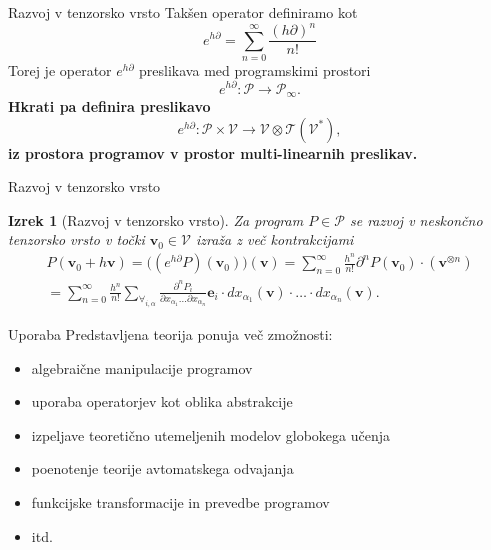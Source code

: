 \documentclass{beamer}
\newcommand{\T}{\mathcal{T}}
\newcommand{\VV}{\mathcal{V}}
\newcommand{\e}{\mathbf{e}}
\newcommand{\vv}{\mathbf{v}}
\newcommand{\dP}{\mathcal{P}}
\newcommand{\D}{\partial}
\newtheorem{izrek}{Izrek}[section]
\begin{document}
\begin{frame}{Razvoj v tenzorsko vrsto}
Takšen operator definiramo kot
\begin{equation*}
 	e^{h\D}=\sum\limits_{n=0}^{\infty}\frac{(h\D)^n}{n!}
 \end{equation*}
 Torej je operator $e^{h\D}$ preslikava med programskimi prostori
  \begin{equation*}
  	e^{h\D}:\dP\to\dP_\infty.
  \end{equation*}
 \textbf{Hkrati pa definira preslikavo}
   \begin{equation*}\label{eq:specProg}
   	e^{h\D}:\dP\times \VV\to \VV\otimes \T(\VV^*),
   \end{equation*}
\textbf{iz prostora programov v prostor multi-linearnih preslikav.}
\end{frame}

\begin{frame}{Razvoj v tenzorsko vrsto}

\begin{izrek}[Razvoj v tenzorsko vrsto]\label{izr:e^d}
	Za program $P\in\dP$  se razvoj v neskončno tenzorsko vrsto
  v točki $\vv_0\in \VV$ izraža z več kontrakcijami 
	\begin{multline*}\label{eq:tenzorVrsta}
	P(\vv_0+h\vv) = \Big((e^{h\D}P)(\vv_0)\Big)(\vv)
  = \sum_{n=0}^\infty\frac{h^n}{n!}\D^nP(\vv_0)\cdot (\vv^{\otimes n})\\
  = \sum_{n=0}^\infty \frac{h^n}{n!}\sum_{\forall_{i,\alpha}}\frac{\partial^nP_i}{\partial
 		    x_{\alpha_1}\ldots \partial x_{\alpha_n}}\e_i\cdot
 		  dx_{\alpha_1}(\vv)\cdot\ldots \cdot dx_{\alpha_n}(\vv).
	\end{multline*}
\end{izrek}

\end{frame}

\begin{frame}{Uporaba}
Predstavljena teorija ponuja več zmožnosti: 
\begin{itemize}
\item
algebraične manipulacije programov
\item
uporaba operatorjev kot oblika abstrakcije
\item
izpeljave teoretično utemeljenih modelov globokega učenja
\item
poenotenje teorije avtomatskega odvajanja
\item
funkcijske transformacije in prevedbe programov
\item
itd.
\end{itemize}
\end{frame}
\end{document}
